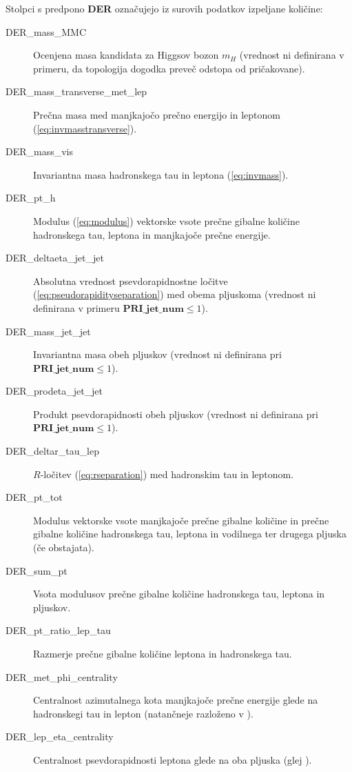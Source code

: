 \documentclass[11pt,a4paper,openany]{book}
\begin{document}
\noindent Stolpci s predpono \textbf{DER} označujejo iz surovih podatkov izpeljane količine:
\begin{changemargin}{0.5cm}{0.0cm} 
\begin{description}
	\item[DER\_mass\_MMC] Ocenjena masa kandidata za Higgsov bozon $m_H$ (vrednost ni definirana v primeru, da topologija dogodka preveč odstopa od pričakovane).
	\item[DER\_mass\_transverse\_met\_lep] Prečna masa med manjkajočo prečno energijo in leptonom (\ref{eq:invmasstransverse}).
	\item[DER\_mass\_vis] Invariantna masa hadronskega tau in leptona (\ref{eq:invmass}).
	\item[DER\_pt\_h] Modulus (\ref{eq:modulus}) vektorske vsote prečne gibalne količine hadronskega tau, leptona in manjkajoče prečne energije.
	\item[DER\_deltaeta\_jet\_jet] Absolutna vrednost psevdorapidnostne ločitve (\ref{eq:pseudorapidityseparation}) med obema pljuskoma (vrednost ni definirana v primeru $\textbf{PRI\_jet\_num} \le 1$).
	\item[DER\_mass\_jet\_jet] Invariantna masa obeh pljuskov (vrednost ni definirana pri \\
		$\textbf{PRI\_jet\_num} \le 1$).
	\item[DER\_prodeta\_jet\_jet] Produkt psevdorapidnosti obeh pljuskov (vrednost ni definirana pri $\textbf{PRI\_jet\_num} \le 1$).
	\item[DER\_deltar\_tau\_lep] $R$-ločitev (\ref{eq:rseparation}) med hadronskim tau in leptonom.
	\item[DER\_pt\_tot] Modulus vektorske vsote manjkajoče prečne gibalne količine in prečne gibalne količine hadronskega tau, leptona in vodilnega ter drugega pljuska (če obstajata).
	\item[DER\_sum\_pt] Vsota modulusov prečne gibalne količine hadronskega tau, leptona in pljuskov.
	\item[DER\_pt\_ratio\_lep\_tau] Razmerje prečne gibalne količine leptona in hadronskega tau.
	\item[DER\_met\_phi\_centrality] Centralnost azimutalnega kota manjkajoče prečne energije glede na hadronskegi tau in lepton (natančneje razloženo v \cite{ChallengeDoc}).
	\item[DER\_lep\_eta\_centrality] Centralnost psevdorapidnosti leptona glede na oba pljuska (glej \cite{ChallengeDoc}).
	
\end{description}
\end{changemargin}
\end{document}
